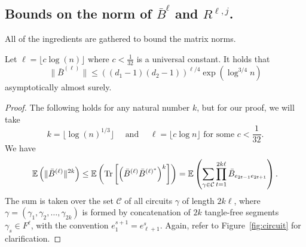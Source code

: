 \subsection{Bounds on the norm of $\bar{B}^{\ell}$ and $R^{\ell,j}$.}
\label{sec:norm_bounds}

All of the ingredients are gathered to bound the matrix norms.

\begin{theorem}
\label{spec_B_bar}
Let 
$\ell = \lfloor c\log(n) \rfloor$ 
where $c < \frac{1}{32}$ 
is a universal constant. 
It holds that
\[
\|\bar{B}^{(\ell)}\|
\leq 
\left((d_1-1)(d_2-1)\right)^{\ell/4}
\exp( \log^{3/4} n )
\]
asymptotically almost surely.
\end{theorem}

\begin{proof}
The following holds for any natural number $k$, but for our proof, we will take
\begin{equation}
 k = \lfloor \log (n)^{1/3} \rfloor \quad \mbox{ and } \quad
 \ell = \lfloor c \log n \rfloor \mbox{ for some } c < \frac{1}{32}.
\end{equation}
We have
\begin{align}
\label{trace_expectation}
\mathbb{E} \left(\| \bar{B}^{(\ell)} \|^{2k} \right)
\leq 
\mathbb{E}
\left( 
\mathrm{Tr} 
 \left[ 
 \left(
 \bar{B}^{(\ell)} \bar{B}^{(\ell)^*} 
 \right)^{k} 
 \right]
\right)
=
\mathbb{E}\left( 
\sum_{\gamma \in \mathcal{C}} 
\prod_{t=1}^{2 k \ell} \bar{B}_{e_{2t-1} e_{2t+1}}
\right).
\end{align}
The sum is taken over the set $\mathcal{C}$ of all circuits 
$\gamma$
of length $2k\ell$,
where
$\gamma= ( \gamma_1, \gamma_2, \ldots, \gamma_{2k} )$ 
is formed by concatenation of $2k$ tangle-free segments
$\gamma_s \in F^{\ell}$, 
with the convention $e^{s+1}_1=e^s_{\ell+1}$.
Again, refer to Figure~\ref{fig:circuit} for clarification.


\end{proof}
